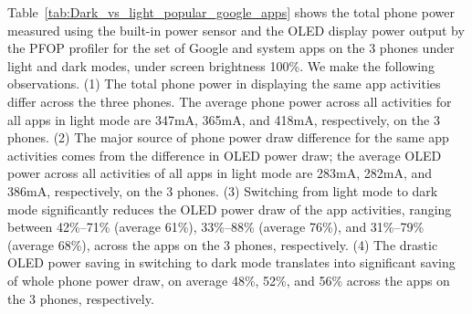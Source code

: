 Table~\ref{tab:Dark_vs_light_popular_google_apps} shows the total
phone power measured using the built-in power sensor and the
OLED display power output by the PFOP profiler
for the set of Google and system apps on the 3 phones under light and dark modes,
under screen brightness 100\%.
We make the following observations.
(1) The total phone power in displaying the same app activities
differ across the three phones. The average phone power across all activities for all apps
in light mode are 347mA, 365mA, and 418mA, respectively, on the 3 phones.
(2) The major source of phone power draw difference for the same app activities
comes from the difference in OLED power draw;
the average OLED power across all activities of all apps
in light mode are 283mA, 282mA, and 386mA, respectively, on the 3 phones.
(3) Switching from light mode to dark mode significantly reduces the OLED power
draw of the app activities, ranging between 42\%--71\% (average 61\%),
33\%--88\% (average 76\%), and 31\%--79\% (average 68\%),
across the apps on the 3 phones, respectively.
(4) The drastic OLED power saving in switching to dark mode 
translates into significant saving of whole phone power draw,
on average 48\%, 52\%, and 56\% across the apps on the 3 phones, respectively.
\fi


